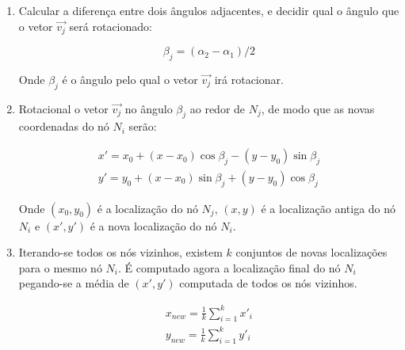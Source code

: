 \begin{enumerate}
    \item Calcular a diferença entre dois ângulos adjacentes, e decidir qual o ângulo que o vetor $\vec{v_j}$ será rotacionado:
    
    \begin{equation*}
        \beta_j = (\alpha_2 - \alpha_1) / 2
    \end{equation*}

    Onde $\beta_j$ é o ângulo pelo qual o vetor $\vec{v_j}$ irá rotacionar.

    \item Rotacional o vetor $\vec{v_j}$ no ângulo $\beta_j$ ao redor de $N_j$, de modo que as novas coordenadas do nó $N_i$ serão:
    
    \begin{equation*}
    \begin{split}
        x' = x_0 + (x-x_0) \cos{\beta_j} - (y-y_0) \sin{\beta_j}\\
        y' = y_0 + (x-x_0) \sin{\beta_j} + (y-y_0) \cos{\beta_j}
    \end{split}
    \end{equation*}

    Onde $(x_0, y_0)$ é a localização do nó $N_j$, $(x,y)$ é a localização antiga do nó $N_i$ e $(x', y')$ é a nova localização do nó $N_i$.

    \item Iterando-se todos os nós vizinhos, existem $k$ conjuntos de novas localizações para o mesmo nó $N_i$. É computado agora a localização final do nó $N_i$ pegando-se a média de $(x', y')$ computada de todos os nós vizinhos.
    
    \begin{equation*}
    \begin{split}
        x_{new} = \frac{1}{k} \sum_{i=1}^k x'_i\\
        y_{new} = \frac{1}{k} \sum_{i=1}^k y'_i
    \end{split}
    \end{equation*}
\end{enumerate}


